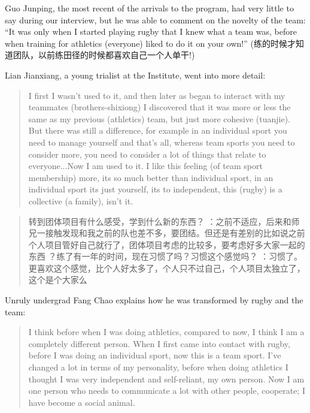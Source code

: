 \begin{CJK}{UTF8}{gbsn}
  Guo Junping, the most recent of the arrivals to the program, had very little to say during our interview, but he was able to comment on the novelty of the team: ``It was only when I started playing rugby that I knew what a team was, before when training for athletics (everyone) liked to do it on your own!'' (练的时候才知道团队，以前练田径的时候都喜欢自己一个人单干!) 

Lian Jianxiang, a young trialist at the Institute, went into more detail:

    \begin{quotation}
     I first I wasn’t used to it, and then later as began to interact with my teammates (brothers-shixiong) I discovered that it was more or less the same as my previous (athletics) team, but just more cohesive (tuanjie).  But there was still a difference, for example in an individual sport you need to manage yourself and that's all, whereas team sports you need to consider more, you need to consider a lot of things that relate to everyone...Now I am used to it. I like this feeling (of team sport membership) more, its so much better than individual sport, in an individual sport its just yourself, its to independent, this (rugby) is a collective  (a family), isn’t it.
    \end{quotation}

    \begin{quotation}
      转到团体项目有什么感受，学到什么新的东西？
     ：之前不适应，后来和师兄一接触发现和我之前的队也差不多，要团结。但还是有差别的比如说之前个人项目管好自己就行了，团体项目考虑的比较多，要考虑好多大家一起的东西
     ？练了有一年的时间，现在习惯了吗？习惯这个感觉吗？
     ：习惯了。更喜欢这个感觉，比个人好太多了，个人只不过自己，个人项目太独立了，这个是个大家么
    \end{quotation}

  Unruly undergrad Fang Chao explains how he was transformed by rugby and the team:

      \begin{quotation}
        I think before when I was doing athletics, compared to now, I think I am a completely different person.  When I first came into contact with rugby, before I was doing an individual sport, now this is a team sport. I've changed a lot in terms of my personality, before when doing athletics I thought I was very independent and self-reliant, my own person.  Now I am one person who needs to communicate a lot with other people, cooperate; I have become a social animal.
      \end{quotation}


\end{CJK}
